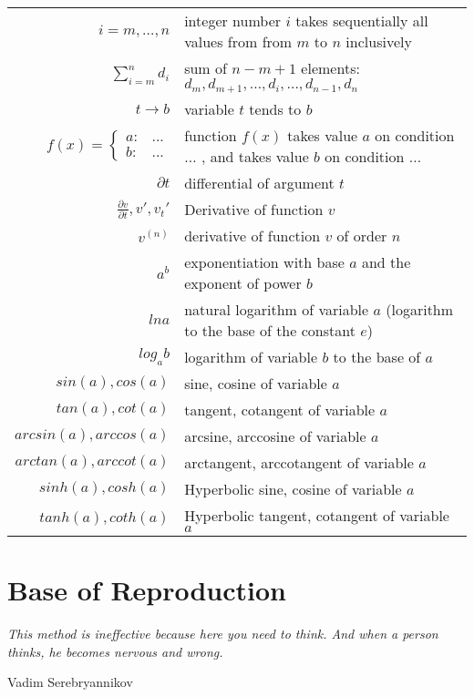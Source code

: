 \documentclass[a4paper, 11pt, oneside]{book}
\newcommand\epigraph[3]{
\vspace{1em}\hfill{}\begin{minipage}{#1}{\begin{spacing}{0.9}
\small\noindent\textit{#2}\end{spacing}
\vspace{1em}
\hfill{}{#3}}\vspace{2em}
\end{minipage}}
\begin{document}
\begin{tabular}{r l}
 $i = m, \ldots, n$ & integer number $i$ takes sequentially all values from from $m$ to $n$ inclusively \\
 $\sum\limits_{i=m}^n d_i$ & sum of $n - m + 1$ elements: $d_m, d_{m+1}, \ldots, d_i, \ldots, d_{n-1}, d_n$ \\
 $t \to b$ & variable $t$ tends to $b$ \\
 $f(x) =
 \begin{cases}
  a: & ...\\
  b: & ...
 \end{cases}$ & function $f(x)$ takes value $a$ on condition $\ldots$ , and takes value $b$ on condition $\ldots$ \\
 $\partial t$ & differential of argument $t$ \\
 $\frac{\partial v}{\partial t}, v', v_t'$ & Derivative of function $v$ \\
 $v^{(n)}$ & derivative of function $v$ of order $n$ \\
 $a^b$ & exponentiation with base $a$ and the exponent of power $b$ \\
 $ln a$ & natural logarithm of variable $a$ (logarithm to the base of the constant $e$) \\
 $log_{a} b$ & logarithm of variable $b$ to the base of $a$ \\
 $sin(a), cos(a)$ & sine, cosine of variable $a$ \\
 $tan(a), cot(a)$ & tangent, cotangent of variable $a$ \\
 $arcsin(a), arccos(a)$ & arcsine, arccosine of variable $a$ \\
 $arctan(a), arccot(a)$ & arctangent, arccotangent of variable $a$ \\
 $sinh(a), cosh(a)$ & Hyperbolic sine, cosine of variable $a$ \\
 $tanh(a), coth(a)$ & Hyperbolic tangent, cotangent of variable $a$
 
\end{tabular}

\chapter{Base of Reproduction}
\pagestyle{fancy}
\fancyhf{}
\lhead{\bfseries\leftmark}
\rhead{\bfseries\rightmark}
\fancyfoot{}
\fancyfoot[R]{\thepage}

\epigraph{4in}{This method is ineffective because here you need to think. And when a person thinks, he becomes nervous and wrong.}{Vadim Serebryannikov}
\end{document}
